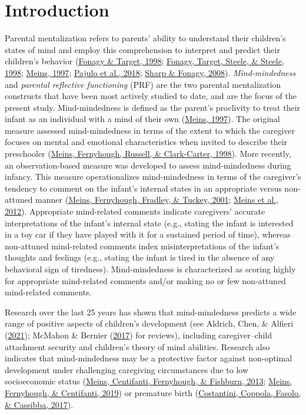 \documentclass[
]{article}
\begin{document}
\hypertarget{introduction}{%
\section*{Introduction}\label{introduction}}

Parental mentalization refers to parents' ability to understand their children's states of mind and employ this comprehension to interpret and predict their children's behavior (\protect\hyperlink{ref-Fonagy1998b}{Fonagy \& Target, 1998}; \protect\hyperlink{ref-Fonagy1998a}{Fonagy, Target, Steele, \& Steele, 1998}; \protect\hyperlink{ref-Meins1997}{Meins, 1997}; \protect\hyperlink{ref-Pajulo2018}{Pajulo et al., 2018}; \protect\hyperlink{ref-Sharp2008}{Sharp \& Fonagy, 2008}). \emph{Mind-mindedness} and \emph{parental reflective functioning} (PRF) are the two parental mentalization constructs that have been most actively studied to date, and are the focus of the present study. Mind-mindedness is defined as the parent's proclivity to treat their infant as an individual with a mind of their own (\protect\hyperlink{ref-Meins1997}{Meins, 1997}). The original measure assessed mind-mindedness in terms of the extent to which the caregiver focuses on mental and emotional characteristics when invited to describe their preschooler (\protect\hyperlink{ref-Meins1998}{Meins, Fernyhough, Russell, \& Clark-Carter, 1998}). More recently, an observation-based measure was developed to assess mind-mindedness during infancy. This measure operationalizes mind-mindedness in terms of the caregiver's tendency to comment on the infant's internal states in an appropriate versus non-attuned manner (\protect\hyperlink{ref-Meins2001}{Meins, Fernyhough, Fradley, \& Tuckey, 2001}; \protect\hyperlink{ref-Meins2012}{Meins et al., 2012}). Appropriate mind-related comments indicate caregivers' accurate interpretations of the infant's internal state (e.g., stating the infant is interested in a toy car if they have played with it for a sustained period of time), whereas non-attuned mind-related comments index misinterpretations of the infant's thoughts and feelings (e.g., stating the infant is tired in the absence of any behavioral sign of tiredness). Mind-mindedness is characterized as scoring highly for appropriate mind-related comments and/or making no or few non-attuned mind-related comments.

Research over the last 25 years has shown that mind-mindedness predicts a wide range of positive aspects of children's development (see Aldrich, Chen, \& Alfieri (\protect\hyperlink{ref-Aldrich2021}{2021}); McMahon \& Bernier (\protect\hyperlink{ref-McMahon2017}{2017}) for reviews), including caregiver--child attachment security and children's theory of mind abilities. Research also indicates that mind-mindedness may be a protective factor against non-optimal development under challenging caregiving circumstances due to low socioeconomic status (\protect\hyperlink{ref-Meins2013}{Meins, Centifanti, Fernyhough, \& Fishburn, 2013}; \protect\hyperlink{ref-Meins2019}{Meins, Fernyhough, \& Centifanti, 2019}) or premature birth (\protect\hyperlink{ref-Costantini2017}{Costantini, Coppola, Fasolo, \& Cassibba, 2017}).
\end{document}
